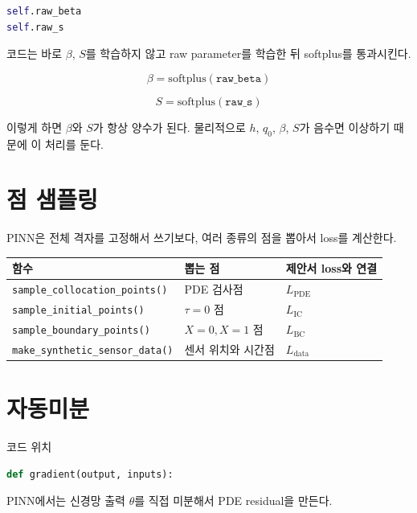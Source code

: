 \documentclass[11pt]{article}
\begin{document}
\begin{lstlisting}[language=Python]
self.raw_beta
self.raw_s
\end{lstlisting}

코드는 바로 \(\beta\), \(S\)를 학습하지 않고 raw parameter를 학습한 뒤 softplus를 통과시킨다.

\begin{equation}
\beta = \mathrm{softplus}(\texttt{raw\_beta})
\end{equation}

\begin{equation}
S = \mathrm{softplus}(\texttt{raw\_s})
\end{equation}

이렇게 하면 \(\beta\)와 \(S\)가 항상 양수가 된다. 물리적으로 \(h\), \(q_0\), \(\beta\), \(S\)가 음수면 이상하기 때문에 이 처리를 둔다.

\section{점 샘플링}

PINN은 전체 격자를 고정해서 쓰기보다, 여러 종류의 점을 뽑아서 loss를 계산한다.

\begin{center}
\begin{tabular}{lll}
\toprule
함수 & 뽑는 점 & 제안서 loss와 연결 \\
\midrule
\texttt{sample\_collocation\_points()} & PDE 검사점 & \(L_{\mathrm{PDE}}\) \\
\texttt{sample\_initial\_points()} & \(\tau=0\) 점 & \(L_{\mathrm{IC}}\) \\
\texttt{sample\_boundary\_points()} & \(X=0, X=1\) 점 & \(L_{\mathrm{BC}}\) \\
\texttt{make\_synthetic\_sensor\_data()} & 센서 위치와 시간점 & \(L_{\mathrm{data}}\) \\
\bottomrule
\end{tabular}
\end{center}

\section{자동미분}

코드 위치

\begin{lstlisting}[language=Python]
def gradient(output, inputs):
\end{lstlisting}

PINN에서는 신경망 출력 \(\theta\)를 직접 미분해서 PDE residual을 만든다.
\end{document}
